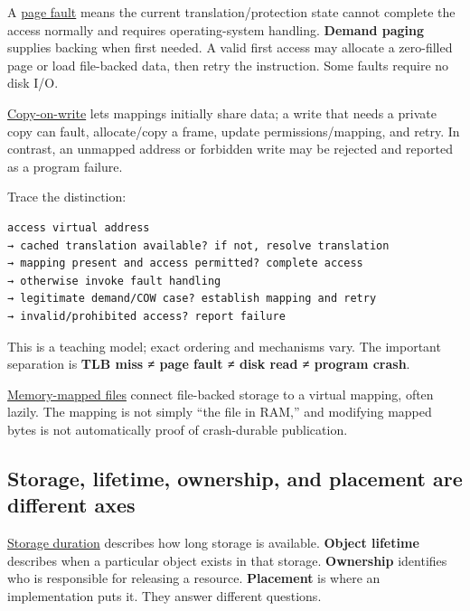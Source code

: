 \hypertarget{01-foundations-i-ch002-a-fault-is-a-request-for-intervention-not-necessarily-a-crash}{}

A \hyperref[appendix-cc0909a7ef14]{page fault} means the current translation/protection state cannot complete the access normally and requires operating-system handling. \textbf{Demand paging} supplies backing when first needed. A valid first access may allocate a zero-filled page or load file-backed data, then retry the instruction. Some faults require no disk I/O.

\hyperref[appendix-7a06e5baac04]{Copy-on-write} lets mappings initially share data; a write that needs a private copy can fault, allocate/copy a frame, update permissions/mapping, and retry. In contrast, an unmapped address or forbidden write may be rejected and reported as a program failure.

Trace the distinction:

\begin{verbatim}
access virtual address
→ cached translation available? if not, resolve translation
→ mapping present and access permitted? complete access
→ otherwise invoke fault handling
→ legitimate demand/COW case? establish mapping and retry
→ invalid/prohibited access? report failure
\end{verbatim}

This is a teaching model; exact ordering and mechanisms vary. The important separation is \textbf{TLB miss ≠ page fault ≠ disk read ≠ program crash}.

\hyperref[appendix-313ee7a0ba7b]{Memory-mapped files} connect file-backed storage to a virtual mapping, often lazily. The mapping is not simply ``the file in RAM,'' and modifying mapped bytes is not automatically proof of crash-durable publication.

\subsection{Storage, lifetime, ownership, and placement are different axes}\label{01-foundations-i-ch002-storage-lifetime-ownership-and-placement-are-different-axes}

\hypertarget{01-foundations-i-ch002-storage-lifetime-ownership-and-placement-are-different-axes}{}

\hyperref[appendix-0b104bcba06b]{Storage duration} describes how long storage is available. \textbf{Object lifetime} describes when a particular object exists in that storage. \textbf{Ownership} identifies who is responsible for releasing a resource. \textbf{Placement} is where an implementation puts it. They answer different questions.

